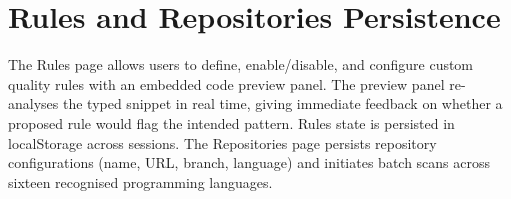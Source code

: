 \documentclass[12pt, oneside]{report}
\begin{document}
\section{Rules and Repositories Persistence}

The Rules page allows users to define, enable/disable, and configure custom quality
rules with an embedded code preview panel. The preview panel re-analyses the typed
snippet in real time, giving immediate feedback on whether a proposed rule would flag
the intended pattern. Rules state is persisted in localStorage across sessions. The
Repositories page persists repository configurations (name, URL, branch, language) and
initiates batch scans across sixteen recognised programming languages.
\end{document}
